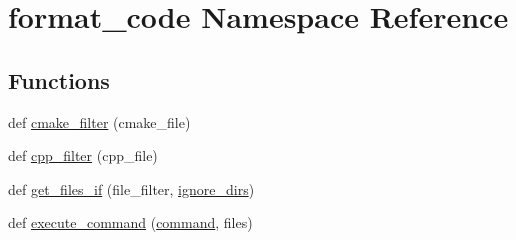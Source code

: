 \hypertarget{namespaceformat__code}{}\section{format\+\_\+code Namespace Reference}
\label{namespaceformat__code}
\subsection*{Functions}
\begin{DoxyCompactItemize}
\item 
def \hyperlink{namespaceformat__code_ad882a5664cd6e807b139747d74171d6b}{cmake\+\_\+filter} (cmake\+\_\+file)
\item 
def \hyperlink{namespaceformat__code_ae832684c35d70292051da5c10b892424}{cpp\+\_\+filter} (cpp\+\_\+file)
\item 
def \hyperlink{namespaceformat__code_a1e2019dc8ff93d15049c66a4e9c94e63}{get\+\_\+files\+\_\+if} (file\+\_\+filter, \hyperlink{namespaceformat__code_a98a7b6be250f74d3192ddcaf0e71dc96}{ignore\+\_\+dirs})
\item 
def \hyperlink{namespaceformat__code_a30ba86369d1c3fae52475d7ea4affd4b}{execute\+\_\+command} (\hyperlink{namespaceformat__code_a01fc8c5f5f8fa2a4d063b8ee9d8f9049}{command}, files)
\end{DoxyCompactItemize}
